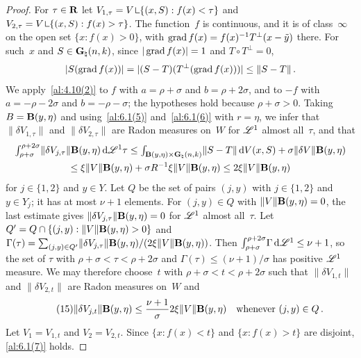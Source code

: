 \begin{proof}
    For $\tau \in \mathbf{R}$ let $V_{1,\tau} = V \restrict \{ (x,S) : f(x) < \tau \}$ and $V_{2,\tau}
    = V \restrict \{ (x,S) : f(x) > \tau \}$. The function~$f$ is continuous, and it is of
    class~$\infty$ on the open set $\{ x : f(x) > 0 \}$, with $\operatorname{grad} f(x) = f(x)^{-1}
    T^\perp(x - \tilde y)$ there. For such~$x$ and $S \in \mathbf{G}_{\natural}(n,k)$, since $|\operatorname{grad}
    f(x)| = 1$ and $T \circ T^\perp = 0$,
    \begin{displaymath}
        |S(\operatorname{grad} f(x))| = |(S - T)(T^\perp(\operatorname{grad} f(x)))| \le \|S - T\| \,.
    \end{displaymath}
    We apply~\ref{al:4.10(2)} to $f$ with $a = \rho + \sigma$ and $b = \rho + 2\sigma$, and to
    $-f$ with $a = - \rho - 2 \sigma$ and $b = - \rho - \sigma$; the hypotheses hold because
    $\rho + \sigma > 0$. Taking $B = \mathbf{B}(y,\eta)$ and using~\ref{al:6.1(5)}
    and~\ref{al:6.1(6)} with $r = \eta$, we infer that $\|\delta V_{1,\tau}\|$ and $\|\delta
    V_{2,\tau}\|$ are Radon measures on~$W$ for $\mathscr{L}^1$ almost all~$\tau$, and that
    \begin{multline*}
        {\textstyle\int_{\rho+\sigma}^{\rho+2\sigma}} \|\delta V_{j,\tau}\| \mathbf{B}(y,\eta) \,\mathrm{d} \mathscr{L}^1 \tau
        \le {\textstyle\int_{\mathbf{B}(y,\eta) \times \mathbf{G}_{\natural}(n,k)}^{}} \|S - T\| \,\mathrm{d} V(x,S) +
        \sigma \|\delta V\| \mathbf{B}(y,\eta) \\ \le \xi \|V\| \mathbf{B}(y,\eta) + \sigma R^{-1} \xi
        \|V\| \mathbf{B}(y,\eta) \le 2 \xi \|V\| \mathbf{B}(y,\eta)
    \end{multline*}
    for $j \in \{1,2\}$ and $y \in Y$. Let $Q$ be the set of pairs $(j,y)$ with $j \in \{1,2\}$
    and $y \in Y_j$; it has at most $\nu + 1$ elements. For $(j,y) \in Q$ with $\|V\|
    \mathbf{B}(y,\eta) = 0$, the last estimate gives $\|\delta V_{j,\tau}\| \mathbf{B}(y,\eta) = 0$
    for $\mathscr{L}^1$ almost all~$\tau$. Let $Q' = Q \cap \{ (j,y) : \|V\| \mathbf{B}(y,\eta) > 0 \}$ and
    $\Gamma(\tau) = {\textstyle\sum_{(j,y) \in Q'}^{}} \|\delta V_{j,\tau}\| \mathbf{B}(y,\eta) / (2 \xi
    \|V\| \mathbf{B}(y,\eta))$. Then ${\textstyle\int_{\rho+\sigma}^{\rho+2\sigma}} \Gamma \,\mathrm{d} \mathscr{L}^1 \le
    \nu + 1$, so the set of $\tau$ with $\rho + \sigma < \tau < \rho + 2 \sigma$ and
    $\Gamma(\tau) \le (\nu+1)/\sigma$ has positive $\mathscr{L}^1$ measure. We may therefore choose~$t$
    with $\rho + \sigma < t < \rho + 2 \sigma$ such that $\|\delta V_{1,t}\|$ and $\|\delta
    V_{2,t}\|$ are Radon measures on~$W$ and
    \begin{equation}
        \tag{15} \label{al:6.1(15)}
        \|\delta V_{j,t}\| \mathbf{B}(y,\eta) \le \frac{\nu + 1}{\sigma} 2 \xi \|V\|
        \mathbf{B}(y,\eta) \quad \text{whenever $(j,y) \in Q$} \,.
    \end{equation}
    Let $V_1 = V_{1,t}$ and $V_2 = V_{2,t}$. Since $\{ x : f(x) < t \}$ and $\{ x : f(x) > t \}$
    are disjoint, \ref{al:6.1(7)} holds.


\end{proof}
